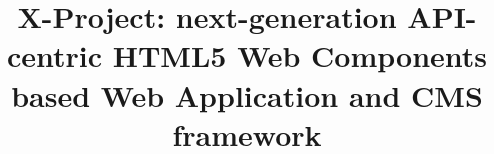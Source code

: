 \documentclass{sig-alternate}
\begin{document}
%

\title{X-Project: next-generation API-centric HTML5 Web Components based Web Application and CMS framework}

%
%
%
%
%
\end{document}
